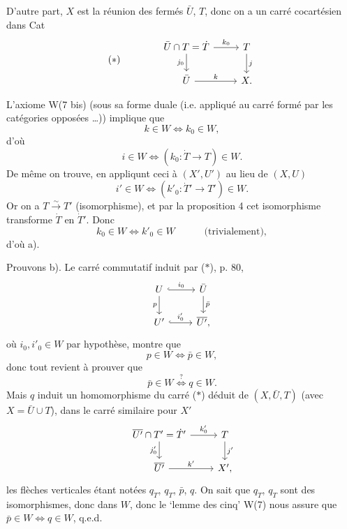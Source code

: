 \documentclass[11pt]{article}
\newcommand{\printedpage}[1]{\marginpar{\footnotesize p.~#1}}
\newcommand{\msp}[1]{\marginpar{\footnotesize [#1]}}
\begin{document}
D’autre part, $X$ est la réunion des fermés $\bar U$, $T$, donc on a un carré cocartésien dans Cat
\[
(*)\qquad\qquad
\begin{tikzcd}
\bar U\cap T=\dot T \arrow[r, "k_0"] \arrow[d, "j_0"'] & T \arrow[d, "j"] \\
\bar U \arrow[r, "k"] & X.
\end{tikzcd}
\]

L’axiome W(7 bis) (sous sa forme duale (i.e. appliqué au carré formé par les catégories opposées \dots)) implique
\msp{page 82}
que
\[
k\in W\iff k_0\in W,
\]
d’où
\[
i\in W\iff (k_0:\dot T\longrightarrow T)\in W.
\]
De même on trouve, en appliqunt ceci à $(X',U')$ au lieu de $(X,U)$ %
\[
i'\in W\iff (k'_0:\dot T'\longrightarrow T')\in W.
\]
Or on a $T\xrightarrow{\sim}T'$ (isomorphisme), et par la proposition 4 cet isomorphisme transforme $\dot T$ en $\dot T'$. Donc
\[
k_0\in W\iff k'_0\in W\qquad\quad\text{(trivialement)},
\]
d’où a).

Prouvons b). Le carré commutatif induit par ($*$), p. 80,
\printedpage{60}
\[
\begin{tikzcd}
U \arrow[r, hook, "i_0"] \arrow[d, "p"'] & \bar U \arrow[d, "\bar p"] \\
U' \arrow[r, hook, "i'_0"] & \overline{U'},
\end{tikzcd}
\]
où $i_0,i'_0\in W$ par hypothèse, montre que
\[
p\in W\iff\bar p\in W,
\]
donc tout revient à prouver que
\[
\bar p\in W\overset{?}{\iff}q\in W.
\]
Mais $q$ induit un homomorphisme du carré ($*$) déduit de $(X,\bar U,T)$ (avec $X=\bar U\cup T$), dans le carré similaire pour $X'$
\[
\begin{tikzcd}
\overline{U'}\cap T'=\dot T' \arrow[r, "k'_0"] \arrow[d, "j'_0"'] & T \arrow[d, "j'"] \\ %
\overline{U'} \arrow[r, "k'"] & X',
\end{tikzcd}
\]
les flèches verticales étant notées $q_{\dot T}$, $q_T$, $\bar p$, $q$.
\msp{page 83}
On sait que $q_{\dot T}$, $q_T$ sont des isomorphismes, donc dans $W$, donc le ‘lemme des cinq’ W(7) nous assure que $\bar p\in W\iff q\in W$, q.e.d.
\end{document}
